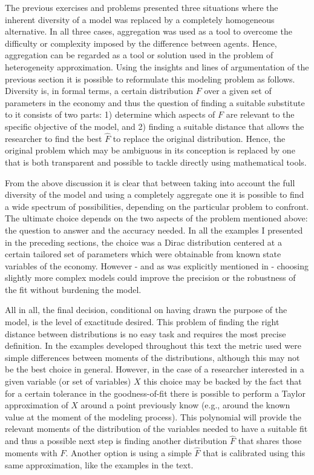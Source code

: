 \documentclass[english, a4paper, 12pt]{article}
\begin{document}
The previous exercises and problems presented three situations where the inherent diversity of a model was replaced by a completely homogeneous alternative. In all three cases, aggregation was used as a tool to overcome the difficulty or complexity imposed by the difference between agents. Hence, aggregation can be regarded as a tool or solution used in the problem of heterogeneity approximation. Using the insights and lines of argumentation of the previous section it is possible to reformulate this modeling problem as follows. Diversity is, in formal terms, a certain distribution $F$ over a given set of parameters in the economy and thus the question of finding a suitable substitute to it consists of two parts: 1) determine which aspects of $F$ are relevant to the specific objective of the model, and 2) finding a suitable distance that allows the researcher to find the best $\hat{F}$ to replace the original distribution. Hence, the original problem which may be ambiguous in its conception is replaced by one that is both transparent and possible to tackle directly using mathematical tools. 

From the above discussion it is clear that between taking into account the full diversity of the model and using a completely aggregate one it is possible to find a wide spectrum of possibilities, depending on the particular problem to confront. The ultimate choice depends on the two aspects of the problem mentioned above: the question to answer and the accuracy needed. In all the examples I presented in the preceding sections, the choice was a Dirac distribution centered at a certain tailored set of parameters which were obtainable from known state variables of the economy. However - and as was explicitly mentioned in  - choosing slightly more complex models could improve the precision or the robustness of the fit without burdening the model.

All in all, the final decision, conditional on having drawn the purpose of the model, is the level of exactitude desired. This problem of finding the right distance between distributions is no easy task and requires the most precise definition. In the examples developed throughout this text the metric used were simple differences between moments of the distributions, although this may not be the best choice in general. However, in the case of a researcher interested in a given variable (or set of variables) $X$ this choice may be backed by the fact that for a certain tolerance in the goodness-of-fit there is possible to perform a Taylor approximation of $X$ around a point previously know (e.g., around the known value at the moment of the modeling process). This polynomial will provide the relevant moments of the distribution of the variables needed to have a suitable fit and thus a possible next step is finding another distribution $\hat{F}$ that shares those moments with $F$. Another option is using a simple $\hat{F}$ that is calibrated using this same approximation, like the examples in the text.
\end{document}
